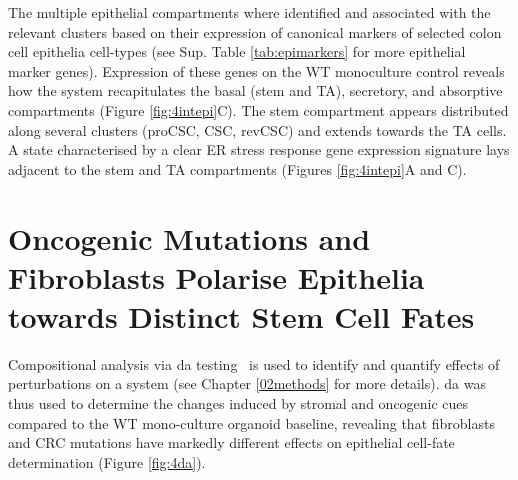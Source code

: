 The multiple epithelial compartments where identified and associated with the relevant clusters based on their expression of canonical markers of selected colon cell epithelia cell-types (see Sup. Table \ref{tab:epimarkers} for more epithelial marker genes). Expression of these genes on the WT monoculture control reveals how the system recapitulates the basal (stem and TA), secretory, and absorptive compartments (Figure \ref{fig:4intepi}C). The stem compartment appears distributed along several clusters (proCSC, CSC, revCSC) and extends towards the TA cells. A state characterised by a clear ER stress response gene expression signature lays adjacent to the stem and TA compartments (Figures \ref{fig:4intepi}A and C).


\section{Oncogenic Mutations and Fibroblasts Polarise Epithelia towards Distinct Stem Cell Fates}

Compositional analysis via \acrfull{da} testing~\cite{dann_differential_2022} is used to identify and quantify effects of perturbations on a system (see Chapter \ref{02methods} for more details). \acrshort{da} was thus used to determine the changes induced by stromal and oncogenic cues compared to the WT mono-culture organoid baseline, revealing that fibroblasts and CRC mutations have markedly different effects on epithelial cell-fate determination (Figure \ref{fig:4da}). 

